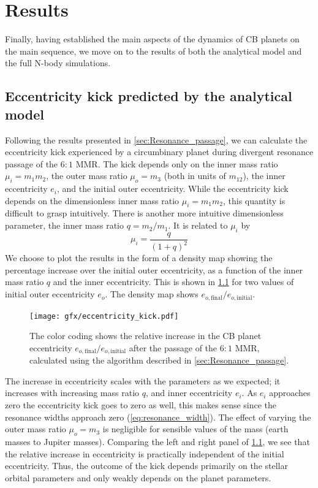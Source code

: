 \documentclass[twoside,openright,titlepage,numbers=noenddot,headinclude,%
                footinclude=true,cleardoublepage=empty,abstractoff, 
                BCOR=5mm,paper=a4,fontsize=11pt,%
                american,%
                ]{scrreprt}%
\begin{document}
\clearpage
\chapter{Results}
\label{ch:results}
Finally, having established the main aspects of the dynamics
of CB planets on the main sequence, we move on to
the results of both the analytical model and the full 
N-body simulations.

\section{Eccentricity kick predicted by the analytical model}
\label{sec:Simulations with a single planet}
Following the results presented in \cref{sec:Resonance_passage}, we can 
calculate the eccentricity kick experienced by a circumbinary planet
during divergent resonance passage of the $6:1$ MMR. The kick depends only on
the inner mass ratio $\mu_i=m_1m_2$, the outer mass ratio $\mu_o=m_3$ 
(both in units of $m_{12}$), the inner eccentricity $e_i$, and the initial 
outer eccentricity.
While the eccentricity kick depends on the dimensionless inner mass ratio
$\mu_i=m_1m_2$, this quantity is difficult to grasp intuitively. There 
is another more
intuitive dimensionless parameter, the inner mass ratio $q=m_2/m_1$. It is
related to $\mu_i$ by
\begin{equation}
    \mu_i = \frac{q}{(1 +q)^2} 
\end{equation}
We choose to plot the results in the form of a 
density map showing the percentage increase over the initial outer eccentricity, as
a function of the inner mass ratio $q$ and the inner eccentricity.
This is shown in \cref{fig:eccentricity_kick} for two values of initial outer 
eccentricity $e_o$. The density map shows $e_{o,\text{final}}/e_{o,\text{initial}}$.
\begin{figure}[htb]
\centering
\texttt{[image: gfx/eccentricity\_kick.pdf]}
    \caption[The kick in eccentricity during resonant passage.]{The color 
    coding shows the relative increase in the CB planet 
    eccentricity $e_{o,\text{final}}/e_{o,\text{initial}}$ after the
    passage of the $6:1$ MMR, calculated using the algorithm described in 
    \cref{sec:Resonance_passage}.}
\label{fig:eccentricity_kick}
\end{figure}

The increase in eccentricity scales with the parameters as we expected;
it increases with increasing mass ratio $q$, and inner eccentricity $e_i$.
As $e_i$ approaches zero the eccentricity kick goes to zero as well, this 
makes sense since the resonance widths approach zero 
(\cref{eq:resonance_width}).
The effect of varying the
outer mass ratio $\mu_o=m_3$ is negligible for sensible values
of the mass (earth masses to Jupiter masses). Comparing the left and right 
panel of \cref{fig:eccentricity_kick}, we see that the relative increase
in eccentricity is practically independent of the initial eccentricity.
Thus, the outcome of the
kick depends primarily on the stellar orbital parameters and only weakly
depends on the planet parameters.
\end{document}
